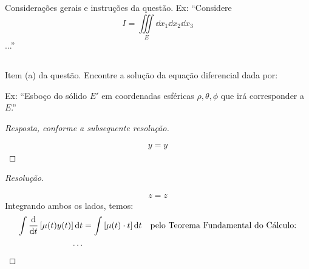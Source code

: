 \documentclass[12pt, a4paper]{article}
\newenvironment{resposta}
  {\renewcommand\qedsymbol{$\blacksquare$}\begin{proof}[Resposta, conforme a subsequente resolução]$ $\par\nobreak\ignorespaces}
  {\end{proof}}
\newenvironment{resolucao}
  {\renewcommand\qedsymbol{$\blacksquare$}\begin{proof}[Resolução]$ $\par\nobreak\ignorespaces}
  {\end{proof}}
\begin{document}
\newcommand{\EXEMPLOITEMa}
{Encontre a solução da equação diferencial dada por:
}

% 
\section{} %
Considerações gerais e instruções da questão. Ex: ``Considere $$I = \iiint\limits_E \dd{x_1} \dd{x_2} \dd{x_3}$$...''

\subsection{} %
Item (a) da questão. \EXEMPLOITEMa
Ex: ``Esboço do sólido  $E'$ em coordenadas esféricas $\rho, \theta, \phi$ que irá corresponder a $E$.''

\begin{resposta}
  \begin{align*}
    y=y
  \end{align*}
\end{resposta}

\begin{resolucao}
  \begin{align}
    z=z
    \label{q2}
  \end{align}
  Integrando ambos os lados, temos:
  \begin{align*}
    \int{ \dv{}{t} \left[\mu(t)y(t)\right] \dd{t} } & = \int{ [\mu(t) \cdot t] \dd{t} }
                                                    &                                   & \text{pelo Teorema Fundamental do Cálculo:} \\
    \dots
  \end{align*}
\end{resolucao}


\end{document}
